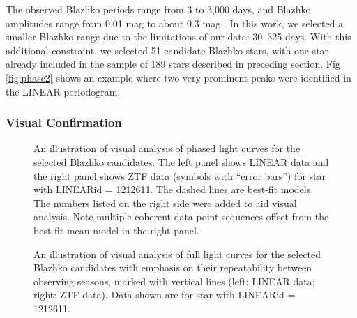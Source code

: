 The observed Blazhko periods range from 3 to 3,000 days, and Blazhko amplitudes range from 0.01 mag to about 0.3 mag \citep{2007MNRAS.377.1263S}. In this work, we selected a smaller Blazhko range due to the limitations of our data: 30--325 days. 
With this additional constraint, we selected 51 candidate Blazhko stars, with one star already included in the sample
of 189 stars described in preceding section. 
Fig \ref{fig:phase2} shows an example where two very prominent peaks were identified in the LINEAR periodogram. 



\subsubsection{Visual Confirmation}

\begin{figure}[ht]
  \centering
  \caption{An illustration of visual analysis of phased light curves for the selected Blazhko candidates. The left
    panel shows LINEAR data and the right panel shows ZTF data
    (symbols with ``error bars'') for star with LINEARid = 1212611. The dashed
    lines are best-fit models. The numbers listed on the right side were added to aid  visual analysis. Note
    multiple coherent data point sequences offset from the best-fit mean model in the right panel.}
       \label{fig:phase1}
\end{figure}

\begin{figure}[ht] 
    \centering
       \caption{An illustration of visual analysis of full light curves for the selected Blazhko candidates with emphasis
         on their repeatability between observing seasons, marked with  vertical lines (left: LINEAR data; right: ZTF data). Data
         shown are for star with LINEARid = 1212611. }
         \label{fig:phase3}
\end{figure}
       
